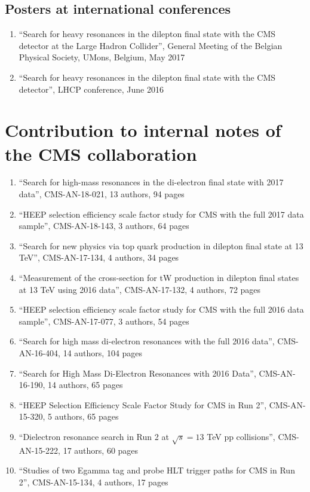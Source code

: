 \subsection*{Posters at international conferences}
\begin{enumerate}%
\item{``Search for heavy resonances in the dilepton final state with the CMS detector at the Large Hadron Collider'', General Meeting of the Belgian Physical Society, UMons, Belgium, May 2017}
\item{``Search for heavy resonances in the dilepton final state with the CMS detector'', LHCP conference, June 2016}
\end{enumerate}




\section*{Contribution to internal notes of the CMS collaboration}
\begin{enumerate}%
\item {``Search for high-mass resonances in the di-electron final state with 2017 data'', CMS-AN-18-021, 13 authors, 94 pages}
\item {``HEEP selection efficiency scale factor study for CMS with the full 2017 data sample'', CMS-AN-18-143, 3 authors, 64 pages}
\item {``Search for new physics via top quark production in dilepton final state at 13 TeV'', CMS-AN-17-134, 4 authors, 34 pages}
\item {``Measurement of the cross-section for tW production in dilepton final states at 13 TeV using 2016 data'', CMS-AN-17-132, 4 authors, 72 pages}
\item {``HEEP selection efficiency scale factor study for CMS with the full 2016 data sample'', CMS-AN-17-077, 3 authors, 54 pages}
\item {``Search for high mass di-electron resonances with the full 2016 data'', CMS-AN-16-404, 14 authors, 104 pages}
\item {``Search for High Mass Di-Electron Resonances with 2016 Data'', CMS-AN-16-190, 14 authors, 65 pages}
\item {``HEEP Selection Efficiency Scale Factor Study for CMS in Run 2'', CMS-AN-15-320, 5 authors, 65 pages}
\item {``Dielectron resonance search in Run 2 at $\sqrt{s}= 13$ TeV pp collisions'', CMS-AN-15-222, 17 authors, 60 pages}
\item {``Studies of two Egamma tag and probe HLT trigger paths for CMS in Run 2'', CMS-AN-15-134, 4 authors, 17 pages}
\end{enumerate}
